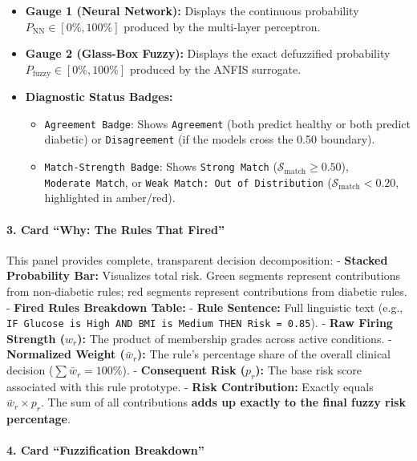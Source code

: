 \documentclass[10pt,a4paper]{article}
\providecommand{\tightlist}{\setlength{\itemsep}{1pt}\setlength{\parskip}{1pt}}
\begin{document}
\begin{itemize}
\tightlist
\item
  \textbf{Gauge 1 (Neural Network):} Displays the continuous probability
  \(P_{\text{NN}} \in [0\%, 100\%]\) produced by the multi-layer
  perceptron.
\item
  \textbf{Gauge 2 (Glass-Box Fuzzy):} Displays the exact defuzzified
  probability \(P_{\text{fuzzy}} \in [0\%, 100\%]\) produced by the
  ANFIS surrogate.
\item
  \textbf{Diagnostic Status Badges:}

  \begin{itemize}
  \tightlist
  \item
    \texttt{Agreement\ Badge}: Shows \texttt{Agreement} (both predict
    healthy or both predict diabetic) or \texttt{Disagreement} (if the
    models cross the 0.50 boundary).
  \item
    \texttt{Match-Strength\ Badge}: Shows \texttt{Strong\ Match}
    (\(\mathcal{S}_{\text{match}} \ge 0.50\)), \texttt{Moderate\ Match},
    or \texttt{Weak\ Match:\ Out\ of\ Distribution}
    (\(\mathcal{S}_{\text{match}} < 0.20\), highlighted in amber/red).
  \end{itemize}
\end{itemize}

\paragraph{3. Card ``Why: The Rules That
Fired''}\label{card-why-the-rules-that-fired}

This panel provides complete, transparent decision decomposition: -
\textbf{Stacked Probability Bar:} Visualizes total risk. Green segments
represent contributions from non-diabetic rules; red segments represent
contributions from diabetic rules. - \textbf{Fired Rules Breakdown
Table:} - \textbf{Rule Sentence:} Full linguistic text (e.g.,
\texttt{IF\ Glucose\ is\ High\ AND\ BMI\ is\ Medium\ THEN\ Risk\ =\ 0.85}).
- \textbf{Raw Firing Strength (\(w_r\)):} The product of membership
grades across active conditions. - \textbf{Normalized Weight
(\(\bar{w}_r\)):} The rule's percentage share of the overall clinical
decision (\(\sum \bar{w}_r = 100\%\)). - \textbf{Consequent Risk
(\(p_r\)):} The base risk score associated with this rule prototype. -
\textbf{Risk Contribution:} Exactly equals \(\bar{w}_r \times p_r\). The
sum of all contributions \textbf{adds up exactly to the final fuzzy risk
percentage}.

\paragraph{4. Card ``Fuzzification
Breakdown''}\label{card-fuzzification-breakdown}
\end{document}
